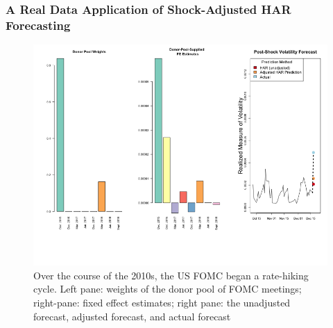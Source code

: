 \documentclass[11pt]{article}
\theoremstyle{definition}
\begin{document}
\subsubsection{A Real Data Application of Shock-Adjusted HAR Forecasting}

\begin{figure}[h!]
  \begin{center}
    \includegraphics[scale=.4]{real_data_output_plots/savetime_SatJun151644072024__^VIX-^IRX-^XAU_^VIX_2018-12-18-2015-12-15-2016-12-13-2017-03-14-2017-06-13-2017-12-12-2018-03-20-2018-06-12-2018-09-25.png}
    \caption{Over the course of the 2010s, the US FOMC began a rate-hiking cycle.  Left pane: weights of the donor pool of FOMC meetings; right-pane: fixed effect estimates; right pane: the unadjusted forecast, adjusted forecast, and actual forecast}
    \label{fig:six_plots}
    \end{center}
  \end{figure}



\end{document}
